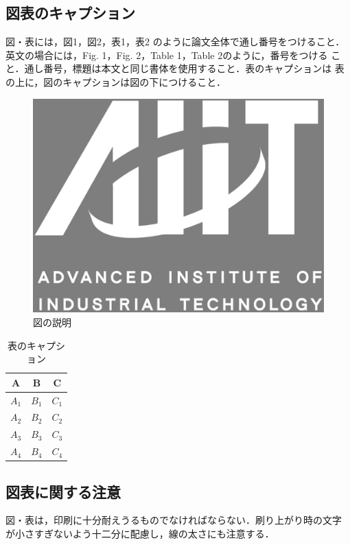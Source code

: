 \documentclass[a4j, 12Q, twocolumn, twoside]{jsarticle}
\begin{document}
\subsection{図表のキャプション}
図・表には，図1，図2，表1，表2 のように論文全体で通し番号をつけること．
英文の場合には，Fig. 1，Fig. 2，Table 1，Table 2のように，番号をつける
こと．通し番号，標題は本文と同じ書体を使用すること．表のキャプションは
表の上に，図のキャプションは図の下につけること．

\begin{figure}
 \begin{center}
  \includegraphics[width=0.8\linewidth]{aiit_symbol.eps}
 \end{center}
 \caption{図の説明}
 \label{fig:one}
\end{figure}

\begin{table}
  \caption{表のキャプション}
  \begin{center}
    \begin{tabular}{|c|c|c|} \hline
    A & B & C \\ \hline
    $A_{1}$ & $B_{1}$ & $C_{1}$ \\ \hline
    $A_{2}$ & $B_{2}$ & $C_{2}$ \\ \hline
    $A_{3}$ & $B_{3}$ & $C_{3}$ \\ \hline
    $A_{4}$ & $B_{4}$ & $C_{4}$ \\ \hline
    \end{tabular}
  \end{center}
\end{table}

\subsection{図表に関する注意}
図・表は，印刷に十分耐えうるものでなければならない．刷り上がり時の文字
が小さすぎないよう十二分に配慮し，線の太さにも注意する．
\end{document}
